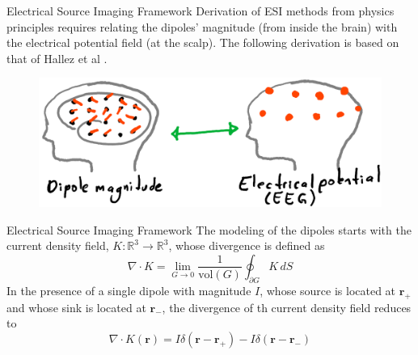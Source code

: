 \documentclass[progressbar=head]{beamer}
\newcommand{\ppar}[1]{ \left( #1 \right) }
\newcommand{\R}{\mathbb{R}}
\newcommand{\rr}{\mathbf{r}}
\begin{document}
\begin{frame}{Electrical Source Imaging Framework}
Derivation of ESI methods from physics principles requires relating the \alert{dipoles' magnitude} (from inside the brain) with the \alert{electrical potential field} (at the scalp).
The following derivation is based on 
that of Hallez et al
\cite{hallez2007review}.

\begin{figure}
\centering
\includegraphics[width=0.75\linewidth]{./img_oldbeamer/sketch04}
\end{figure}
\end{frame}

\begin{frame}{Electrical Source Imaging Framework}
    The modeling of the dipoles starts with the \alert{current density field}, $K: \R^3 \rightarrow \R^3$, whose divergence is defined as
    \begin{equation}
        \nabla \cdot K = \lim_{G \rightarrow 0} \frac{1}{\text{vol}\ppar{G}}
        \oint_{\partial G} K\, dS
    \end{equation}
    In the presence of a single dipole with magnitude $I$, whose source is located at $\rr_{+}$ and whose sink is located at $\rr_{-}$, the divergence of th current density field reduces to
    \begin{equation}
        \nabla \cdot K(\rr) = I \delta\ppar{\rr-\rr_+} - I \delta\ppar{\rr-\rr_-}
        \label{eq:curr_density}
    \end{equation}
\end{frame}
\end{document}
